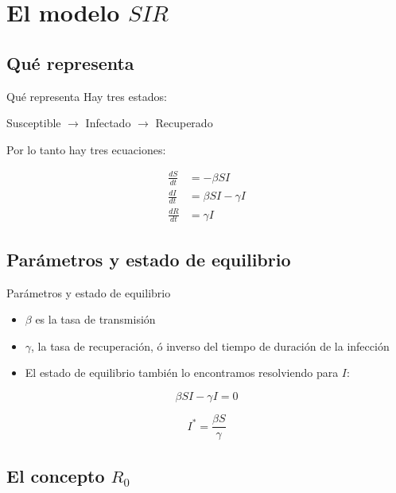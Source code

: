 \documentclass[
  11pt,
  ignorenonframetext,
]{beamer}
\begin{document}
\hypertarget{el-modelo-sir}{%
\section{\texorpdfstring{El modelo
\(SIR\)}{El modelo SIR}}\label{el-modelo-sir}}

\hypertarget{quuxe9-representa}{%
\subsection{Qué representa}\label{quuxe9-representa}}

\begin{frame}{Qué representa}
Hay tres estados:

Susceptible \(\rightarrow\) Infectado \(\rightarrow\) Recuperado

Por lo tanto hay tres ecuaciones:

\begin{align}
\frac{dS}{dt} &= -\beta SI \\
\frac{dI}{dt} &= \beta SI - \gamma I \\
\frac{dR}{dt} &= \gamma I
\end{align}
\end{frame}

\hypertarget{paruxe1metros-y-estado-de-equilibrio}{%
\subsection{Parámetros y estado de
equilibrio}\label{paruxe1metros-y-estado-de-equilibrio}}

\begin{frame}{Parámetros y estado de equilibrio}
\begin{itemize}
\item
  \(\beta\) es la tasa de transmisión
\item
  \(\gamma\), la tasa de recuperación, ó inverso del tiempo de duración
  de la infección
\item
  El estado de equilibrio también lo encontramos resolviendo para \(I\):
\end{itemize}

\[\beta SI - \gamma I = 0\]

\[I^* = \frac{\beta S}{\gamma}\]
\end{frame}

\hypertarget{el-concepto-r_0}{%
\subsection{\texorpdfstring{El concepto
\(R_0\)}{El concepto R\_0}}\label{el-concepto-r_0}}
\end{document}
